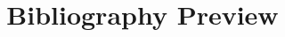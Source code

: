 \documentclass[acmsmall]{acmart}
\begin{document}
\title{Bibliography Preview}
\renewcommand{\shortauthors}{Bibliography Preview}
\maketitle
\nocite{*}


\end{document}
